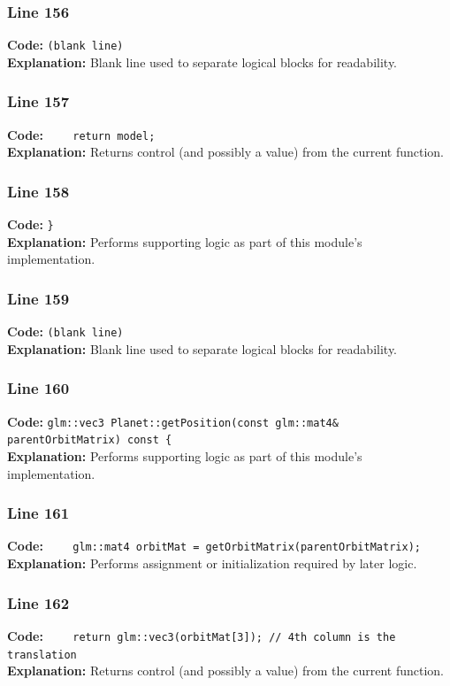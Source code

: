 \documentclass[11pt,a4paper]{article}
\begin{document}
\subsubsection*{Line 156}
\textbf{Code:} \texttt{(blank line)}\\
\textbf{Explanation:} Blank line used to separate logical blocks for readability.

\subsubsection*{Line 157}
\textbf{Code:} \verb|    return model;|\\
\textbf{Explanation:} Returns control (and possibly a value) from the current function.

\subsubsection*{Line 158}
\textbf{Code:} \verb|}|\\
\textbf{Explanation:} Performs supporting logic as part of this module's implementation.

\subsubsection*{Line 159}
\textbf{Code:} \texttt{(blank line)}\\
\textbf{Explanation:} Blank line used to separate logical blocks for readability.

\subsubsection*{Line 160}
\textbf{Code:} \verb|glm::vec3 Planet::getPosition(const glm::mat4& parentOrbitMatrix) const {|\\
\textbf{Explanation:} Performs supporting logic as part of this module's implementation.

\subsubsection*{Line 161}
\textbf{Code:} \verb|    glm::mat4 orbitMat = getOrbitMatrix(parentOrbitMatrix);|\\
\textbf{Explanation:} Performs assignment or initialization required by later logic.

\subsubsection*{Line 162}
\textbf{Code:} \verb|    return glm::vec3(orbitMat[3]); // 4th column is the translation|\\
\textbf{Explanation:} Returns control (and possibly a value) from the current function.
\end{document}
